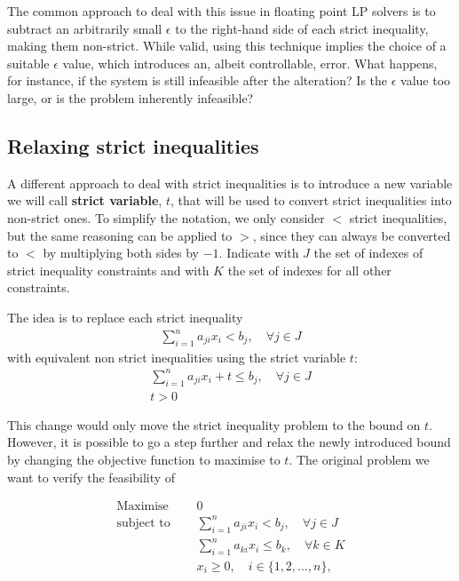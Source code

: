 \documentclass[preview,border=12pt,varwidth]{report}
\begin{document}
The common approach to deal with this issue in floating point LP solvers is to subtract an arbitrarily small $\epsilon$ to the right-hand side of each strict inequality, making them non-strict.
While valid, using this technique implies the choice of a suitable $\epsilon$ value, which introduces an, albeit controllable, error.
What happens, for instance, if the system is still infeasible after the alteration?
Is the $\epsilon$ value too large, or is the problem inherently infeasible?

\subsection*{Relaxing strict inequalities}

A different approach to deal with strict inequalities is to introduce a new variable we will call \textbf{strict variable}, $t$, that will be used to convert strict inequalities into non-strict ones.
To simplify the notation, we only consider $<$ strict inequalities, but the same reasoning can be applied to $>$, since they can always be converted to $<$ by multiplying both sides by $-1$.
Indicate with $J$ the set of indexes of strict inequality constraints and with $K$ the set of indexes for all other constraints.

The idea is to replace each strict inequality
\begin{align*}
    \sum_{i=1}^{n} a_{ji}x_{i} < b_j, \quad \forall j \in J
\end{align*}
with equivalent non strict inequalities using the strict variable $t$:
\begin{align*}
    \sum_{i=1}^{n} a_{ji}x_{i} + t \le b_j, \quad \forall j \in J \\
    t > 0
\end{align*}

This change would only move the strict inequality problem to the bound on $t$.
However, it is possible to go a step further and relax the newly introduced bound by changing the objective function to maximise to $t$.
The original problem we want to verify the feasibility of

\begin{equation}
    \label{eq:lp-original}
    \begin{split}
        \text{Maximise }   \quad & 0                                                          \\
        \text{subject to } \quad & \sum_{i=1}^{n} a_{ji}x_{i} < b_j,   \quad \forall j \in J  \\
        \quad                    & \sum_{i=1}^{n} a_{ki}x_{i} \le b_k,  \quad \forall k \in K \\
        & x_i \ge 0,  \quad i \in \{1, 2, \ldots, n\},
    \end{split}
\end{equation}
\end{document}
